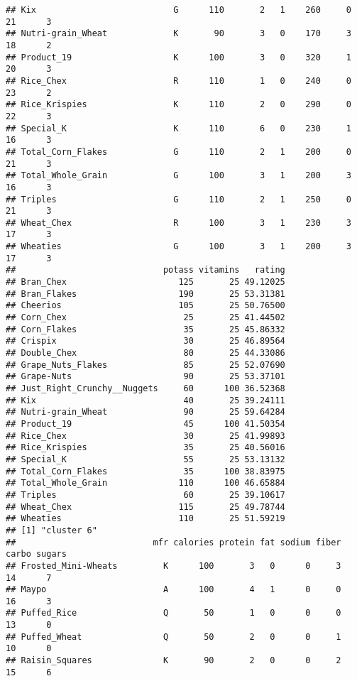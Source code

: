 \documentclass[
]{article}
\begin{document}
\begin{verbatim}
## Kix                           G      110       2   1    260     0    21      3
## Nutri-grain_Wheat             K       90       3   0    170     3    18      2
## Product_19                    K      100       3   0    320     1    20      3
## Rice_Chex                     R      110       1   0    240     0    23      2
## Rice_Krispies                 K      110       2   0    290     0    22      3
## Special_K                     K      110       6   0    230     1    16      3
## Total_Corn_Flakes             G      110       2   1    200     0    21      3
## Total_Whole_Grain             G      100       3   1    200     3    16      3
## Triples                       G      110       2   1    250     0    21      3
## Wheat_Chex                    R      100       3   1    230     3    17      3
## Wheaties                      G      100       3   1    200     3    17      3
##                             potass vitamins   rating
## Bran_Chex                      125       25 49.12025
## Bran_Flakes                    190       25 53.31381
## Cheerios                       105       25 50.76500
## Corn_Chex                       25       25 41.44502
## Corn_Flakes                     35       25 45.86332
## Crispix                         30       25 46.89564
## Double_Chex                     80       25 44.33086
## Grape_Nuts_Flakes               85       25 52.07690
## Grape-Nuts                      90       25 53.37101
## Just_Right_Crunchy__Nuggets     60      100 36.52368
## Kix                             40       25 39.24111
## Nutri-grain_Wheat               90       25 59.64284
## Product_19                      45      100 41.50354
## Rice_Chex                       30       25 41.99893
## Rice_Krispies                   35       25 40.56016
## Special_K                       55       25 53.13132
## Total_Corn_Flakes               35      100 38.83975
## Total_Whole_Grain              110      100 46.65884
## Triples                         60       25 39.10617
## Wheat_Chex                     115       25 49.78744
## Wheaties                       110       25 51.59219
## [1] "cluster 6"
##                           mfr calories protein fat sodium fiber carbo sugars
## Frosted_Mini-Wheats         K      100       3   0      0     3    14      7
## Maypo                       A      100       4   1      0     0    16      3
## Puffed_Rice                 Q       50       1   0      0     0    13      0
## Puffed_Wheat                Q       50       2   0      0     1    10      0
## Raisin_Squares              K       90       2   0      0     2    15      6

\end{verbatim}
\end{document}
